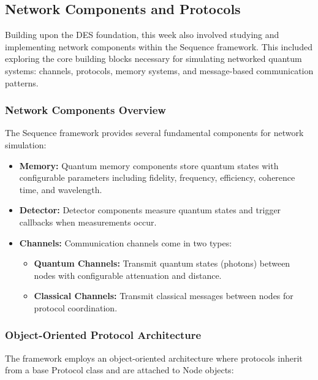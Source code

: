 \subsection{Network Components and Protocols}

Building upon the DES foundation, this week also involved studying and implementing network components within the Sequence framework. This included exploring the core building blocks necessary for simulating networked quantum systems: channels, protocols, memory systems, and message-based communication patterns.

\subsubsection{Network Components Overview}

The Sequence framework provides several fundamental components for network simulation:

\begin{itemize}
    \item \textbf{Memory:} Quantum memory components store quantum states with configurable parameters including fidelity, frequency, efficiency, coherence time, and wavelength.
    
    \item \textbf{Detector:} Detector components measure quantum states and trigger callbacks when measurements occur.
    
    \item \textbf{Channels:} Communication channels come in two types:
    \begin{itemize}
        \item \textbf{Quantum Channels:} Transmit quantum states (photons) between nodes with configurable attenuation and distance.
        \item \textbf{Classical Channels:} Transmit classical messages between nodes for protocol coordination.
    \end{itemize}
\end{itemize}

\subsubsection{Object-Oriented Protocol Architecture}

The framework employs an object-oriented architecture where protocols inherit from a base Protocol class and are attached to Node objects:

